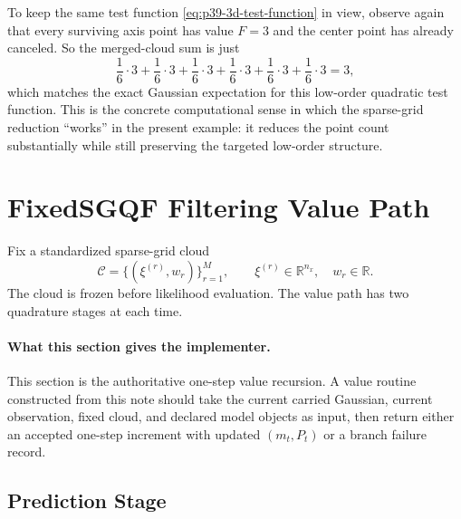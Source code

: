 \documentclass[11pt]{article}
\numberwithin{equation}{section}
\newcommand{\R}{\mathbb R}
\begin{document}
To keep the same test function \eqref{eq:p39-3d-test-function} in view, observe
again that every surviving axis point has value \(F=3\) and the center point has
already canceled.  So the merged-cloud sum is just
\begin{equation}
  \frac16\cdot 3 + \frac16\cdot 3 + \frac16\cdot 3 + \frac16\cdot 3 +
  \frac16\cdot 3 + \frac16\cdot 3 = 3,
  \label{eq:p39-3d-toy-cloud-sum}
\end{equation}
which matches the exact Gaussian expectation for this low-order quadratic test
function.  This is the concrete computational sense in which the sparse-grid
reduction ``works'' in the present example: it reduces the point count
substantially while still preserving the targeted low-order structure.

\section{FixedSGQF Filtering Value Path}
\label{sec:p31-value-path}

Fix a standardized sparse-grid cloud
\begin{equation}
  \mathcal C=\{(\xi^{(r)},w_r)\}_{r=1}^M,
  \qquad
  \xi^{(r)}\in\R^{n_x},
  \quad
  w_r\in\R.
  \label{eq:p31-cloud-for-filter}
\end{equation}
The cloud is frozen before likelihood evaluation.  The value path has two
quadrature stages at each time.

\paragraph{What this section gives the implementer.}
This section is the authoritative one-step value recursion.  A value routine
constructed from this note should take the current carried Gaussian,
current observation, fixed cloud, and declared model objects as input, then
return either an accepted one-step increment with updated \((m_t,P_t)\) or a
branch failure record.

\subsection{Prediction Stage}
\end{document}
